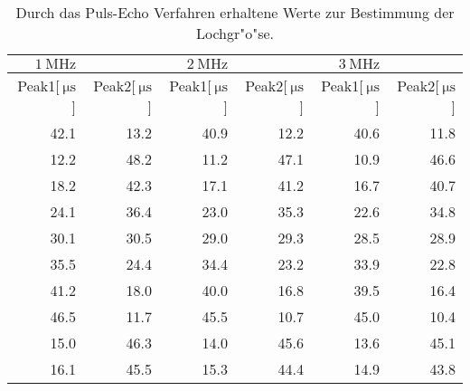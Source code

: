 
\begin{table}[!h]
\begin{center}
\begin{tabular}{|r|r|r|r|r|r|}
\hline
 $\SI{1}{\mega\hertz}$ && $\SI{2}{\mega\hertz}$ && $\SI{3}{\mega\hertz}$&\\
\hline
Peak1[$\SI{}{\micro\second}$] & Peak2[$\SI{}{\micro\second}$] & Peak1[$\SI{}{\micro\second}$] & Peak2[$\SI{}{\micro\second}$] & Peak1[$\SI{}{\micro\second}$] & Peak2[$\SI{}{\micro\second}$]\\
\hline
\hline
42.1 &	13.2 &	40.9 &	12.2 &	40.6 &	11.8\\
12.2 &	48.2 &	11.2 &	47.1 &	10.9 &	46.6\\
18.2 &	42.3 &	17.1 &	41.2 &	16.7 &	40.7\\
24.1 &	36.4 &	23.0 &	35.3 &	22.6 &	34.8\\
30.1 &	30.5 &	29.0 &	29.3 &	28.5 &	28.9\\
35.5 &	24.4 &	34.4 &	23.2 &	33.9 &	22.8\\
41.2 &	18.0 &	40.0 &	16.8 &	39.5 &	16.4\\
46.5 &	11.7 &	45.5 &	10.7 &	45.0 &	10.4\\
15.0 &	46.3 &	14.0 &	45.6 &	13.6 &	45.1\\
16.1 &	45.5 &	15.3 &	44.4 &	14.9 &	43.8\\
\hline
\end{tabular}
\caption[]{Durch das Puls-Echo Verfahren erhaltene Werte zur Bestimmung der Lochgr"o"se.}
\label{loch1}
\end{center}
\end{table}